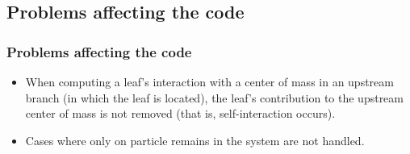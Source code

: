 \begin{frame}
	\section{Problems affecting the code}
	\frametitle{Problems affecting the code}
	\begin{itemize}
		\item When computing a leaf's interaction with a center of mass in an upstream branch (in which the leaf is located), the leaf's contribution to the upstream center of mass is not removed (that is, self-interaction occurs).
		\item Cases where only on particle remains in the system are not handled.
	\end{itemize}
\end{frame}